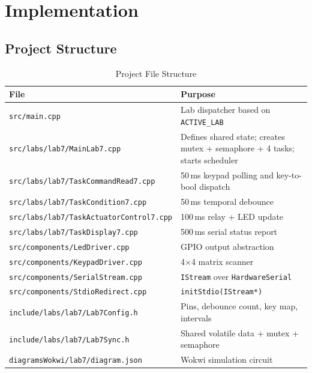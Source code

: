 \documentclass[12pt]{article}
\begin{document}
\section{Implementation}

\subsection{Project Structure}

\begin{table}[H]
\centering
\begin{tabular}{@{}lp{8.0cm}@{}}
\toprule
\textbf{File} & \textbf{Purpose} \\
\midrule
\texttt{src/main.cpp}                            & Lab dispatcher based on \texttt{ACTIVE\_LAB} \\
\texttt{src/labs/lab7/MainLab7.cpp}              & Defines shared state; creates mutex + semaphore + 4 tasks; starts scheduler \\
\texttt{src/labs/lab7/TaskCommandRead7.cpp}      & 50\,ms keypad polling and key-to-bool dispatch \\
\texttt{src/labs/lab7/TaskCondition7.cpp}        & 50\,ms temporal debounce \\
\texttt{src/labs/lab7/TaskActuatorControl7.cpp}  & 100\,ms relay + LED update \\
\texttt{src/labs/lab7/TaskDisplay7.cpp}          & 500\,ms serial status report \\
\texttt{src/components/LedDriver.cpp}            & GPIO output abstraction \\
\texttt{src/components/KeypadDriver.cpp}         & 4$\times$4 matrix scanner \\
\texttt{src/components/SerialStream.cpp}         & \texttt{IStream} over \texttt{HardwareSerial} \\
\texttt{src/components/StdioRedirect.cpp}        & \texttt{initStdio(IStream*)} \\
\texttt{include/labs/lab7/Lab7Config.h}          & Pins, debounce count, key map, intervals \\
\texttt{include/labs/lab7/Lab7Sync.h}            & Shared volatile data + mutex + semaphore \\
\texttt{diagramsWokwi/lab7/diagram.json}         & Wokwi simulation circuit \\
\bottomrule
\end{tabular}
\caption{Project File Structure}
\label{tab:files}
\end{table}
\end{document}
